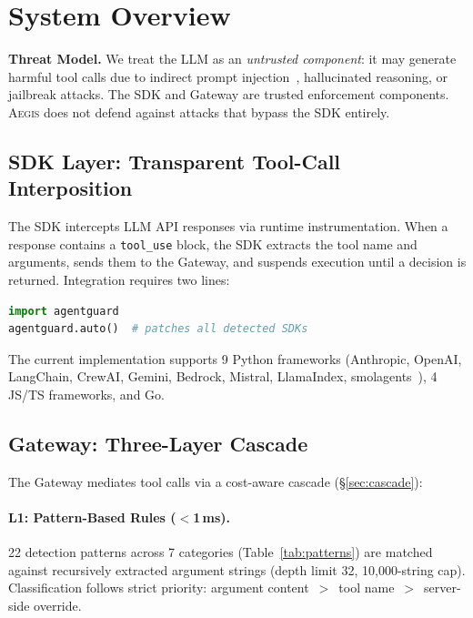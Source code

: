 \documentclass[sigconf,anonymous]{acmart}
\newcommand{\system}{\textsc{Aegis}\xspace}
\begin{document}
\section{System Overview}
\label{sec:arch}

\noindent\textbf{Threat Model.}
We treat the LLM as an \emph{untrusted component}: it may generate harmful tool calls due to indirect prompt injection~\cite{greshake2023not}, hallucinated reasoning, or jailbreak attacks. The SDK and Gateway are trusted enforcement components. \system does not defend against attacks that bypass the SDK entirely.

\subsection{SDK Layer: Transparent Tool-Call Interposition}
\label{sdk-layer}

The SDK intercepts LLM API responses via runtime instrumentation. When a response contains a \texttt{tool\_use} block, the SDK extracts the tool name and arguments, sends them to the Gateway, and suspends execution until a decision is returned. Integration requires two lines:

\begin{lstlisting}[language=Python, basicstyle=\scriptsize\ttfamily]
import agentguard
agentguard.auto()  # patches all detected SDKs
\end{lstlisting}

\noindent The current implementation supports 9 Python frameworks (Anthropic, OpenAI, LangChain, CrewAI, Gemini, Bedrock, Mistral, LlamaIndex, smolagents~\cite{smolagents2024}), 4 JS/TS frameworks, and Go.

\subsection{Gateway: Three-Layer Cascade}
\label{gateway}

The Gateway mediates tool calls via a cost-aware cascade (\S\ref{sec:cascade}):

\paragraph{L1: Pattern-Based Rules ($<$1\,ms).}
22 detection patterns across 7 categories (Table~\ref{tab:patterns}) are matched against recursively extracted argument strings (depth limit 32, 10{,}000-string cap). Classification follows strict priority: argument content~$>$~tool name~$>$~server-side override.
\end{document}

